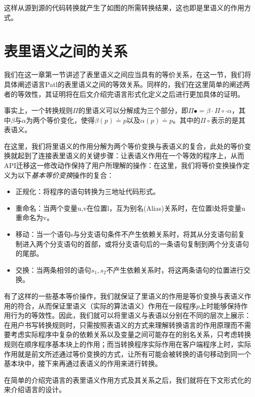 这样从源到源的代码转换就产生了如图的所需转换结果，这也即是里语义的作用方式。

\section{表里语义之间的关系}
我们在这一章第一节讲述了表里语义之间应当具有的等价关系，在这一节，我们将具体阐述语言Patl的表里语义之间的等效关系。同样的，我们在这里简单的阐述两者的等效性，其证明将在后文介绍完语言形式化定义之后进行更加具体的证明。

事实上，一个转换规则$\Pi$的里语义可以分解成为三个部分，即$\Pi\bullet=\beta\cdot\Pi\circ\cdot\alpha$，其中$\beta$与$\alpha$为两个等价变化，使得$\beta(p)\doteq p$以及$\alpha(p)\doteq p$。其中的$\Pi\circ$表示的是其表语义。

在这里，我们将里语义的作用分解为两个等价变换与表语义的复合，此处的等价变换就起到了连接表里语义的关键步骤：让表语义作用在一个等效的程序上，从而API迁移这一修改动作保持了用户所理解的操作：在这里，我们将等价变换操作定义为以下\textit{基本等价变换}操作的复合：
\begin{itemize}
\item 正规化：将程序的语句转换为三地址代码形式。
\item 重命名：当两个变量u,v在位置l，互为别名(Alias)关系时，在位置l处将变量u重命名为v。
\item 移动：当一个语句s与分支语句条件不产生依赖关系时，将其从分支语句前复制进入两个分支语句的首部，或将分支语句后的一条语句复制到两个分支语句的尾部。
\item 交换：当两条相邻的语句$s_1,s_2$不产生依赖关系时，将这两条语句的位置进行交换。
\end{itemize}

有了这样的一些基本等价操作，我们就保证了里语义的作用是等价变换与表语义作用的符合，从而保证里语义（实际的算法语义）作用在一段程序$p$上时能够保持作用行为的等效性。因此，我们就可以将里语义与表语以分别在不同的层次上展示：在用户书写转换规则时，只需按照表语义的方式来理解转换语言的作用原理而不需要考虑实际程序中复杂的依赖关系以及变量之间可能存在的别名关系，只考虑转换规则在顺序程序基本块上的作用；而当转换程序实际作用在客户端程序上时，实际作用就是前文所述通过等价变换的方式，让所有可能会被转换的语句移动到同一个基本块中，接下来再通过表语义的作用来进行转换。

在简单的介绍完语言的表里语义作用方式及其关系之后，我们就将在下文形式化的来介绍语言的设计。